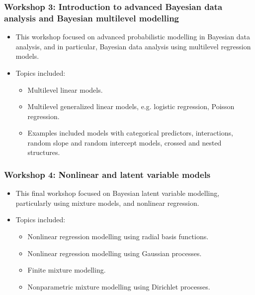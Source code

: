 \begin{frame}
	\frametitle{Workshop 3: Introduction to advanced Bayesian data analysis and Bayesian multilevel modelling}

	\begin{itemize}
		\item This workshop focused on advanced probabilistic modelling
			in Bayesian data analysis, and in particular, Bayesian
			data analysis using multilevel regression models.
		\item Topics included:
			\begin{itemize}
				\item Multilevel linear models.
				\item Multilevel generalized linear models, e.g. logistic regression, Poisson regression.
				\item Examples included models with categorical predictors, interactions, random slope and random intercept models, crossed and nested structures.
			\end{itemize}
	\end{itemize}

\end{frame}

\begin{frame}
	\frametitle{Workshop 4: Nonlinear and latent variable models}

	\begin{itemize}
		\item This final workshop focused on Bayesian latent variable modelling, particularly using mixture models, and nonlinear regression.
		\item Topics included:
			\begin{itemize}
				\item Nonlinear regression modelling using radial basis functions. 
				\item Nonlinear regression modelling using Gaussian processes.
				\item Finite mixture modelling.
				\item Nonparametric mixture modelling using Dirichlet processes. 
			\end{itemize}


	\end{itemize}

\end{frame}

